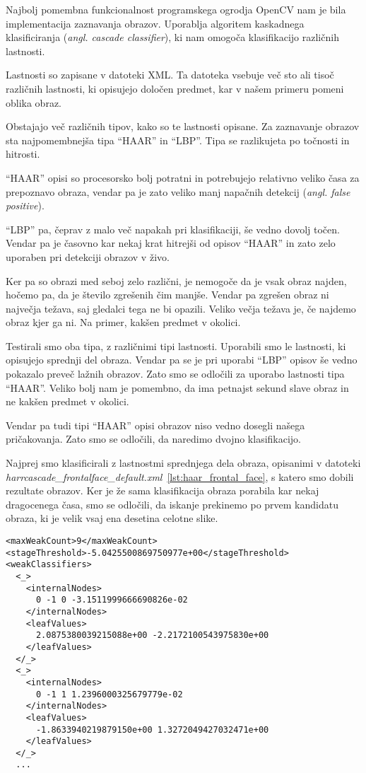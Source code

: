 Najbolj pomembna funkcionalnost programskega ogrodja OpenCV nam je bila
implementacija zaznavanja obrazov. Uporablja algoritem kaskadnega
klasificiranja (\textit{angl. cascade classifier}), ki nam omogoča
klasifikacijo različnih lastnosti.

Lastnosti so zapisane v datoteki XML. Ta datoteka vsebuje več sto ali tisoč
različnih lastnosti, ki opisujejo določen predmet, kar v našem primeru pomeni
oblika obraz.

Obstajajo več različnih tipov, kako so te lastnosti opisane. Za zaznavanje
obrazov sta najpomembnejša tipa ``HAAR'' in ``LBP''. Tipa se razlikujeta po
točnosti in hitrosti.

``HAAR'' opisi so procesorsko bolj potratni in potrebujejo relativno veliko
časa za prepoznavo obraza, vendar pa je zato veliko manj napačnih detekcij
(\textit{angl. false positive}).

``LBP'' pa, čeprav z malo več napakah pri klasifikaciji, še vedno dovolj
točen. Vendar pa je časovno kar nekaj krat hitrejši od opisov ``HAAR'' in zato
zelo uporaben pri detekciji obrazov v živo.

Ker pa so obrazi med seboj zelo različni, je nemogoče da je vsak obraz najden,
hočemo pa, da je število zgrešenih čim manjše. Vendar pa zgrešen obraz ni
največja težava, saj gledalci tega ne bi opazili. Veliko večja težava je, če
najdemo obraz kjer ga ni. Na primer, kakšen predmet v okolici.

Testirali smo oba tipa, z različnimi tipi lastnosti. Uporabili smo le
lastnosti, ki opisujejo sprednji del obraza. Vendar pa se je pri uporabi
``LBP'' opisov še vedno pokazalo preveč lažnih obrazov. Zato smo se odločili
za uporabo lastnosti tipa ``HAAR''. Veliko bolj nam je pomembno, da ima
petnajst sekund slave obraz in ne kakšen predmet v okolici.

Vendar pa tudi tipi ``HAAR'' opisi obrazov niso vedno dosegli našega
pričakovanja. Zato smo se odločili, da naredimo dvojno klasifikacijo.

Najprej smo klasificirali z lastnostmi sprednjega dela obraza, opisanimi v datoteki
\textit{harrcascade\_frontalface\_default.xml}~\ref{lst:haar_frontal_face}, s
katero smo dobili rezultate obrazov. Ker je že sama klasifikacija obraza
porabila kar nekaj dragocenega časa, smo se odločili, da iskanje prekinemo po
prvem kandidatu obraza, ki je velik vsaj ena desetina celotne slike.

\begin{lstlisting}[label=lst:haar_frontal_face, caption=Izsek iz datoteke harrcascade\_frontalface\_default.xml]
<maxWeakCount>9</maxWeakCount>
<stageThreshold>-5.0425500869750977e+00</stageThreshold>
<weakClassifiers>
  <_>
    <internalNodes>
      0 -1 0 -3.1511999666690826e-02
    </internalNodes>
    <leafValues>
      2.0875380039215088e+00 -2.2172100543975830e+00
    </leafValues>
  </_>
  <_>
    <internalNodes>
      0 -1 1 1.2396000325679779e-02
    </internalNodes>
    <leafValues>
      -1.8633940219879150e+00 1.3272049427032471e+00
    </leafValues>
  </_>
  ...
\end{lstlisting}

